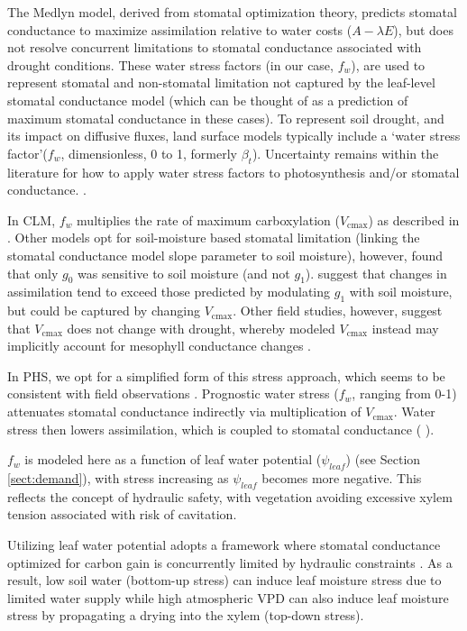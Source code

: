 \documentclass[draft,linenumbers]{agujournal}
\begin{document}
    The Medlyn model, derived from stomatal optimization theory, predicts stomatal conductance to maximize assimilation relative to water costs ($A-\lambda E$), 
    but does not resolve concurrent limitations to stomatal conductance associated with drought conditions.   These water stress factors (in our case, $f_w$), are used to represent stomatal and non-stomatal limitation not captured by the leaf-level stomatal conductance model (which can be thought of as a prediction of maximum stomatal conductance in these cases). To represent soil drought, and its impact on diffusive fluxes, land surface models typically include a `water stress factor'($f_w$, dimensionless, 0 to 1, formerly $\beta_t$). Uncertainty remains within the literature for how to apply water stress factors to photosynthesis and/or stomatal conductance. 
    \citep{zhou2013,novick2016a,sperry2015}.
    
    In CLM, $f_w$ multiplies the rate of maximum carboxylation ($V_{\text{cmax}}$) as described in \citet{oleson2013}. Other models opt for soil-moisture based stomatal limitation (linking the stomatal conductance model slope parameter to soil moisture), however,
    \cite{lin2018} found that only $g_0$ was sensitive to soil moisture (and not $g_1$).
    \cite{zhou2013} suggest that changes in assimilation tend to exceed those predicted by modulating $g_1$ with soil moisture, but could be captured by changing $V_{\text{cmax}}$.
    Other field studies, however, suggest that $V_{\text{cmax}}$ does not change with drought, whereby modeled $V_{\text{cmax}}$ instead may implicitly account for mesophyll conductance changes \citep{flexas2004}.
    
    In PHS, we opt for a simplified form of this stress approach, which seems to be consistent with field observations \citep{lin2018}. Prognostic water stress ($f_w$, ranging from 0-1) attenuates stomatal conductance indirectly via multiplication of $V_{\text{cmax}}$. Water stress then lowers assimilation, which is coupled to stomatal conductance ( \citep{medlyn2011}).
    
    $f_w$ is modeled here as a function of leaf water potential ($\psi_{leaf}$) (see Section \ref{sect:demand}), with stress increasing as $\psi_{leaf}$ becomes more negative.
    This reflects the concept of hydraulic safety, with vegetation avoiding excessive xylem tension associated with risk of cavitation.
    
    Utilizing leaf water potential adopts a framework where stomatal conductance optimized for carbon gain is concurrently limited by hydraulic constraints \citep{novick2016a}. As a result, low soil water (bottom-up stress) can induce leaf moisture stress due to limited water supply while high atmospheric VPD can also induce leaf moisture stress by propagating a drying into the xylem (top-down stress).
    
\end{document}

